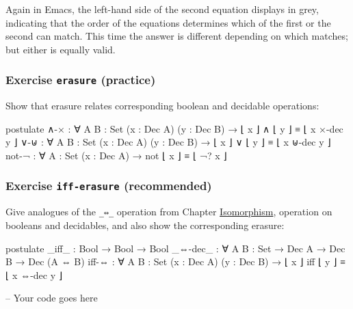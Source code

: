 Again in Emacs, the left-hand side of the second equation displays in
grey, indicating that the order of the equations determines which of the
first or the second can match. This time the answer is different
depending on which matches; but either is equally valid.

\hypertarget{exercise-erasure-practice}{%
\subsubsection{\texorpdfstring{Exercise \texttt{erasure}
(practice)}{Exercise erasure (practice)}}\label{exercise-erasure-practice}}

Show that erasure relates corresponding boolean and decidable
operations:

\begin{fence}
\begin{code}
postulate
  ∧-× : ∀ {A B : Set} (x : Dec A) (y : Dec B) → ⌊ x ⌋ ∧ ⌊ y ⌋ ≡ ⌊ x ×-dec y ⌋
  ∨-⊎ : ∀ {A B : Set} (x : Dec A) (y : Dec B) → ⌊ x ⌋ ∨ ⌊ y ⌋ ≡ ⌊ x ⊎-dec y ⌋
  not-¬ : ∀ {A : Set} (x : Dec A) → not ⌊ x ⌋ ≡ ⌊ ¬? x ⌋
\end{code}
\end{fence}

\hypertarget{exercise-iff-erasure-recommended}{%
\subsubsection{\texorpdfstring{Exercise \texttt{iff-erasure}
(recommended)}{Exercise iff-erasure (recommended)}}\label{exercise-iff-erasure-recommended}}

Give analogues of the \texttt{\_⇔\_} operation from Chapter
\protect\hyperlink{Isomorphism-iff}{Isomorphism}, operation on booleans
and decidables, and also show the corresponding erasure:

\begin{fence}
\begin{code}
postulate
  _iff_ : Bool → Bool → Bool
  _⇔-dec_ : ∀ {A B : Set} → Dec A → Dec B → Dec (A ⇔ B)
  iff-⇔ : ∀ {A B : Set} (x : Dec A) (y : Dec B) → ⌊ x ⌋ iff ⌊ y ⌋ ≡ ⌊ x ⇔-dec y ⌋
\end{code}
\end{fence}

\begin{fence}
\begin{code}
-- Your code goes here
\end{code}
\end{fence}

